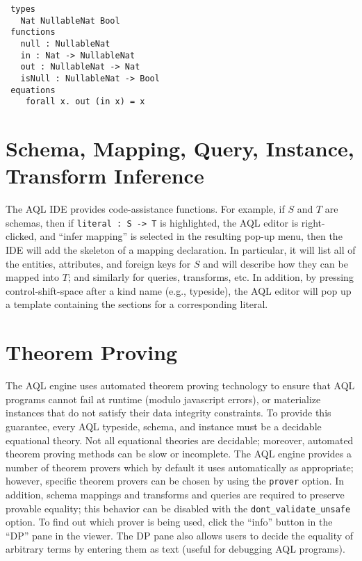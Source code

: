 \documentclass[10pt]{book}
\begin{document}
\begin{verbatim}
 types
   Nat NullableNat Bool
 functions
   null : NullableNat
   in : Nat -> NullableNat	
   out : NullableNat -> Nat
   isNull : NullableNat -> Bool
 equations
    forall x. out (in x) = x	
\end{verbatim}	

\section{Schema, Mapping, Query, Instance, Transform Inference}

The AQL IDE provides code-assistance functions.  For example, if $S$ and $T$ are schemas, then if {\tt literal : S -> T} is highlighted, the AQL editor is right-clicked, and ``infer mapping'' is selected in the resulting pop-up menu, then the IDE will add the skeleton of a mapping declaration.  In particular, it will list all of the entities, attributes, and foreign keys for $S$ and will describe how they can be mapped into $T$; and similarly for queries, transforms, etc.  In addition, by pressing control-shift-space after a kind name (e.g., typeside), the AQL editor will pop up a template containing the sections for a corresponding literal.

\section{Theorem Proving}

The AQL engine uses automated theorem proving technology to ensure that AQL programs cannot fail at runtime (modulo javascript errors), or materialize instances that do not satisfy their data integrity constraints.  To provide this guarantee, every AQL typeside, schema, and instance must be a decidable equational theory.  Not all equational theories are decidable; moreover, automated theorem proving methods can be slow or incomplete.  The AQL engine provides a number of theorem provers which by default it uses automatically as appropriate; however, specific theorem provers can be chosen by using the {\tt prover} option.  In addition, schema mappings and transforms and queries are required to preserve provable equality; this behavior can be disabled with the {\tt dont\_validate\_unsafe} option.  To find out which prover is being used, click the ``info'' button in the ``DP'' pane in the viewer.  The DP pane also allows users to decide the equality of arbitrary terms by entering them as text (useful for debugging AQL programs).
\end{document}

